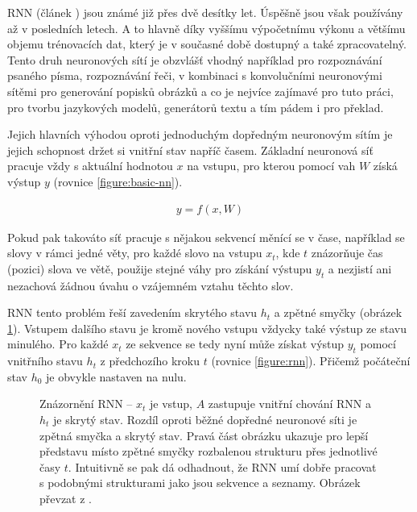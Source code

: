 RNN (článek \cite{rnn}) jsou známé již přes dvě desítky let. Úspěšně jsou však používány až v posledních letech. A to hlavně díky vyššímu výpočetnímu výkonu a většímu objemu trénovacích dat, který je v současné době dostupný a také zpracovatelný. Tento druh neuronových sítí je obzvlášť vhodný například pro rozpoznávání psaného písma, rozpoznávání řeči, v kombinaci s konvolučními neuronovými sítěmi pro generování popisků obrázků a co je nejvíce zajímavé pro tuto práci, pro tvorbu jazykových modelů, generátorů textu a tím pádem i pro překlad.

Jejich hlavních výhodou oproti jednoduchým dopředným neuronovým sítím je jejich schopnost držet si vnitřní stav napříč časem. Základní neuronová síť pracuje vždy s aktuální hodnotou $x$ na vstupu, pro kterou pomocí vah $W$ získá výstup $y$ (rovnice \ref{figure:basic-nn}).

\begin{align}\label{figure:basic-nn}
  y = f (x, W)
\end{align}

Pokud pak takováto síť pracuje s nějakou sekvencí měnící se v čase, například se slovy v rámci jedné věty, pro každé slovo na vstupu $x_t$, kde $t$ znázorňuje čas (pozici) slova ve větě, použije stejné váhy pro získání výstupu $y_t$ a nezjistí ani nezachová žádnou úvahu o vzájemném vztahu těchto slov.

RNN tento problém řeší zavedením skrytého stavu $h_t$ a zpětné smyčky (obrázek \ref{img:rnn}). Vstupem dalšího stavu je kromě nového vstupu vždycky také výstup ze stavu minulého. Pro každé $x_t$ ze sekvence se tedy nyní může získat výstup $y_t$ pomocí vnitřního stavu $h_t$ z předchozího kroku $t$ (rovnice \ref{figure:rnn}). Přičemž počáteční stav  $h_0$ je obvykle nastaven na nulu.


\begin{figure}[H]
    \begin{center}
    \end{center}
	\caption{Znázornění RNN -- $x_t$ je vstup, $A$ zastupuje vnitřní chování RNN a $h_t$ je skrytý stav. Rozdíl oproti běžné dopředné neuronové síti je zpětná smyčka a skrytý stav. Pravá část obrázku ukazuje pro lepší představu místo zpětné smyčky rozbalenou strukturu přes jednotlivé časy $t$. Intuitivně se pak dá odhadnout, že RNN umí dobře pracovat s podobnými strukturami jako jsou sekvence a seznamy. Obrázek převzat z \cite{understandingLSTM}.}	
	\label{img:rnn}
\end{figure}


